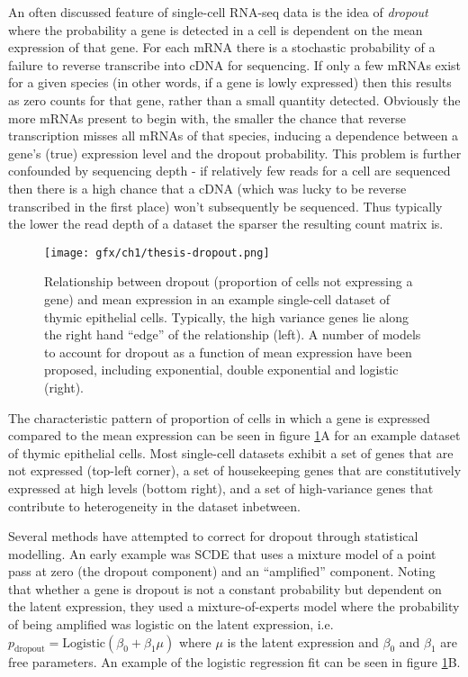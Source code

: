 An often discussed feature of single-cell RNA-seq data is the idea of \emph{dropout} where the probability a gene is detected in a cell is dependent on the mean expression of that gene. For each mRNA there is a stochastic probability of a failure to reverse transcribe into cDNA for sequencing. If only a few mRNAs exist for a given species (in other words, if a gene is lowly expressed) then this results as zero counts for that gene, rather than a small quantity detected. Obviously the more mRNAs present to begin with, the smaller the chance that reverse transcription misses all mRNAs of that species, inducing a dependence between a gene's (true) expression level and the dropout probability. This problem is further confounded by sequencing depth - if relatively few reads for a cell are sequenced then there is a high chance that a cDNA (which was lucky to be reverse transcribed in the first place) won't subsequently be sequenced. Thus typically the lower the read depth of a dataset the sparser the resulting count matrix is.

\begin{figure}
\centering
  \texttt{[image: gfx/ch1/thesis-dropout.png]}
  \caption[Mean-dropout relationship in an example single-cell dataset.]{Relationship between dropout (proportion of cells not expressing a gene) and mean expression in an example single-cell dataset of thymic epithelial cells. Typically, the high variance genes lie along the right hand ``edge'' of the relationship (left). A number of models to account for dropout as a function of mean expression have been proposed, including exponential, double exponential and logistic (right).} \label{fig:intro_dropout}
\end{figure}

The characteristic pattern of proportion of cells in which a gene is expressed compared to the mean expression can be seen in figure \ref{fig:intro_dropout}A for an example dataset of thymic epithelial cells. Most single-cell datasets exhibit a set of genes that are not expressed (top-left corner), a set of housekeeping genes that are constitutively expressed at high levels (bottom right), and a set of high-variance genes that contribute to heterogeneity in the dataset inbetween.

Several methods have attempted to correct for dropout through statistical modelling. An early example was SCDE \cite{Kharchenko2014} that uses a mixture model of a point pass at zero (the dropout component) and an ``amplified'' component. Noting that whether a gene is dropout is not a constant probability but dependent on the latent expression, they used a mixture-of-experts model where the probability of being amplified was logistic on the latent expression, i.e. $p_{\text{dropout}} = \text{Logistic}(\beta_0 + \beta_1 \mu)$ where $\mu$ is the latent expression and $\beta_0$ and $\beta_1$ are free parameters. An example of the logistic regression fit can be seen in figure \ref{fig:intro_dropout}B.

